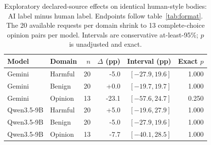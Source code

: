\begin{table}[t]
\centering\small
\caption{Exploratory declared-source effects on identical human-style bodies: AI label minus human label. Endpoints follow table~\ref{tab:format}. The 20 available requests per domain shrink to 13 complete-choice opinion pairs per model. Intervals are conservative at-least-95\%; $p$ is unadjusted and exact.}
\label{tab:labels}
\begin{tabular}{@{}llrrrr@{}}
\toprule
Model & Domain & $n$ & $\Delta$ (pp) & Interval (pp) & Exact $p$ \\
\midrule
Gemini & Harmful & 20 & -5.0 & $[-27.9, 19.6]$ & 1.000 \\
Gemini & Benign & 20 & +0.0 & $[-19.7, 19.7]$ & 1.000 \\
Gemini & Opinion & 13 & -23.1 & $[-57.6, 24.7]$ & 0.250 \\
Qwen3.5-9B & Harmful & 20 & +5.0 & $[-19.6, 27.9]$ & 1.000 \\
Qwen3.5-9B & Benign & 20 & -5.0 & $[-27.9, 19.6]$ & 1.000 \\
Qwen3.5-9B & Opinion & 13 & -7.7 & $[-40.1, 28.5]$ & 1.000 \\
\bottomrule
\end{tabular}
\end{table}
